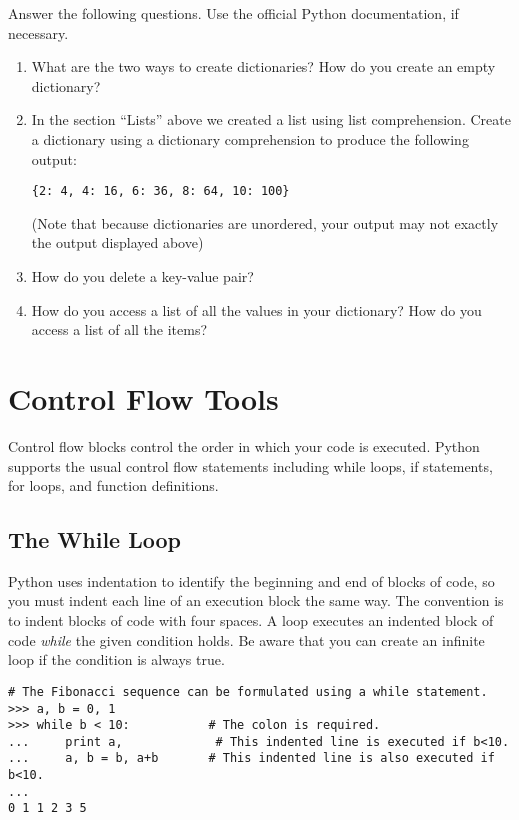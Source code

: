 \begin{problem}
Answer the following questions. Use the official Python documentation, if necessary.
\begin{enumerate}
\item What are the two ways to create dictionaries? How do you create an empty dictionary?
\item In the section ``Lists'' above we created a list using list comprehension. Create a dictionary using a dictionary comprehension to produce the following output:

\begin{lstlisting}
{2: 4, 4: 16, 6: 36, 8: 64, 10: 100}
\end{lstlisting}

(Note that because dictionaries are unordered, your output may not exactly the output displayed above)
\item How do you delete a key-value pair?
\item How do you access a list of all the values in your dictionary?  
How do you access a list of all the items?
\end{enumerate}
\end{problem}


\section*{Control Flow Tools}
Control flow blocks control the order in which your code is executed.
Python supports the usual control flow statements 
including while loops, if statements, for loops, and function definitions. 

\subsection*{The While Loop}
Python uses indentation to identify the beginning and end of blocks of code, so you must indent each line of an execution block the same way.
The convention is to indent blocks of code with four spaces. A  loop executes an indented block of code \emph{while} the given condition holds. 
Be aware that you can create an infinite loop if the condition is always true.

\begin{lstlisting}
# The Fibonacci sequence can be formulated using a while statement. 
>>> a, b = 0, 1
>>> while b < 10:           # The colon is required.
...     print a,             # This indented line is executed if b<10.
...     a, b = b, a+b       # This indented line is also executed if b<10.
...     
0 1 1 2 3 5
\end{lstlisting}


